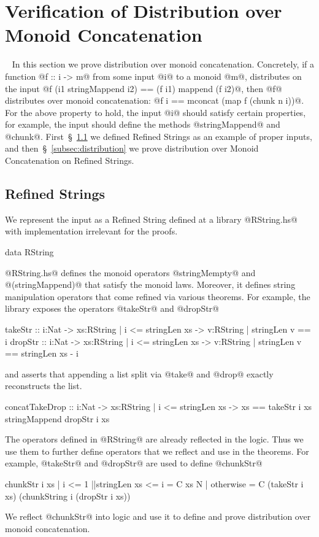 \section{Verification of Distribution over Monoid Concatenation}~\label{sec:monoid:distribution}
In this section we prove distribution over monoid concatenation. 
%
Concretely, if a function @f :: i -> m@
from some input @i@ to a monoid @m@, 
distributes on the input
@f (i1 stringMappend i2) == (f i1) mappend (f i2)@, 
then @f@ distributes over monoid concatenation: 
@f i == mconcat (map f (chunk n i))@. 
%
For the above property to hold, the input @i@
should satisfy certain properties, 
for example, the input should define the methods
@stringMappend@ and @chunk@. 
%
First~\S~\ref{subsec:rstring} we defined Refined Strings 
as an example of proper inputs, and then~\S~\ref{subsec:distribution}
we prove distribution over Monoid Concatenation on Refined Strings.  


\subsection{Refined Strings}\label{subsec:rstring}
We represent the input as a Refined String 
defined at a library @RString.hs@
with implementation irrelevant for the proofs.  
%
\begin{code}
data RString
\end{code}
%
@RString.hs@
defines the monoid operators @stringMempty@ and @(stringMappend)@
that satisfy the monoid laws. 
%
Moreover, it defines string manipulation operators
that come refined via various theorems. 
%
For example, the library exposes the
operators @takeStr@ and @dropStr@
\begin{code}
takeStr :: i:Nat -> xs:{RString | i <= stringLen xs } 
  -> {v:RString | stringLen v == i }
dropStr :: i:Nat -> xs:{RString | i <= stringLen xs } 
  -> {v:RString | stringLen v == stringLen xs - i}
\end{code}
%
and asserts that appending a list split via @take@ and @drop@
exactly reconstructs the list.
\begin{code}
concatTakeDrop 
  :: i:Nat -> xs:{RString | i <= stringLen xs} 
  -> {xs == takeStr i xs stringMappend dropStr i xs }
\end{code}
%
The operators defined in @RString@ are already reflected in the logic. 
%
Thus we use them to further define operators
that we reflect and use in the theorems. 
%
For example, @takeStr@ and @dropStr@ are used to define 
@chunkStr@ 
\begin{code}
chunkStr i xs 
  | i <= 1 ||stringLen xs <= i 
  = C xs N 
  | otherwise
  = C (takeStr i xs) (chunkString i (dropStr i xs))
\end{code}
%
We reflect @chunkStr@ into logic and use it to define and prove 
distribution over monoid concatenation. 


